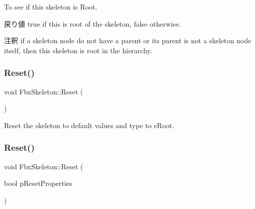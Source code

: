 To see if this skeleton is Root. \begin{DoxyReturn}{戻り値}
{\ttfamily true} if this is root of the skeleton, {\ttfamily false} otherwise. 
\end{DoxyReturn}
\begin{DoxyRemark}{注釈}
if a skeleton node do not have a parent or its parent is not a skeleton node itself, then this skeleton is root in the hierarchy. 
\end{DoxyRemark}
\mbox{\label{class_fbx_skeleton_a622069fcb67d773d755e96b321df1094}} 
\subsubsection{\texorpdfstring{Reset()}{Reset()}\hspace{0.1cm}{\footnotesize\ttfamily [1/2]}}
{\footnotesize\ttfamily void Fbx\+Skeleton\+::\+Reset (\begin{DoxyParamCaption}{ }\end{DoxyParamCaption})}



Reset the skeleton to default values and type to {\ttfamily e\+Root}. 

\mbox{\label{class_fbx_skeleton_a1ffc5d46440a35d2ddfa75f20918c1b4}} 
\subsubsection{\texorpdfstring{Reset()}{Reset()}\hspace{0.1cm}{\footnotesize\ttfamily [2/2]}}
{\footnotesize\ttfamily void Fbx\+Skeleton\+::\+Reset (\begin{DoxyParamCaption}\item[{bool}]{p\+Reset\+Properties }\end{DoxyParamCaption})\hspace{0.3cm}{\ttfamily [protected]}}

\mbox{\label{class_fbx_skeleton_a19297c7b85e06e47c34e2a97964d7de8}} 

